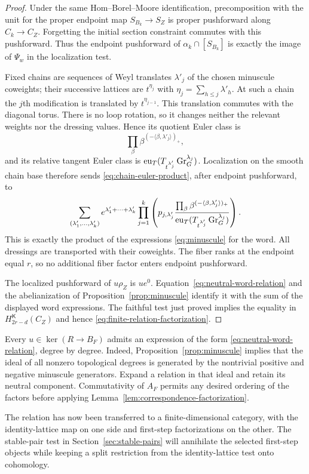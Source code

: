 \begin{proof}
Under the same Hom--Borel--Moore identification, precomposition with the
unit for the proper endpoint map $S_{B_k}\to S_Z$ is proper pushforward
along $C_k\to C_Z$.  Forgetting the initial section constraint commutes
with this pushforward.  Thus the endpoint pushforward of
$\alpha_k\cap[S_{B_k}]$ is exactly the image of $\Psi_w$ in the
localization test.

Fixed chains are sequences of Weyl translates $\lambda'_j$ of the chosen
minuscule coweights; their successive lattices are
$t^{\eta_j}$ with $\eta_j=\sum_{h\leq j}\lambda'_h$.
At such a chain the $j$th modification is translated by
$t^{\eta_{j-1}}$.  This translation commutes with the diagonal torus.
There is no loop rotation, so it changes neither the relevant weights nor
the dressing values.  Hence its quotient Euler class is
\[
 \prod_\beta\beta^{(-\langle\beta,\lambda'_j\rangle)_+},
\]
and its relative tangent Euler class is
$\operatorname{eu}_T(T_{t^{\lambda'_j}}\operatorname{Gr}_G^{\lambda_j})$.
Localization on the smooth chain base therefore sends
\eqref{eq:chain-euler-product}, after endpoint pushforward, to
\[
 \sum_{(\lambda'_1,\ldots,\lambda'_k)}
 e^{\lambda'_1+\cdots+\lambda'_k}
 \prod_{j=1}^k
 \left(
 p_{j,\lambda'_j}
 \frac{\prod_\beta\beta^{(-\langle\beta,\lambda'_j\rangle)_+}}
 {\operatorname{eu}_T(T_{t^{\lambda'_j}}\operatorname{Gr}_G^{\lambda_j})}
 \right).
\]
This is exactly the product of the expressions
\eqref{eq:minuscule} for the word.  All dressings are transported with
their coweights.  The fiber ranks at the endpoint equal $r$, so no
additional fiber factor enters endpoint pushforward.

The localized pushforward of $u\rho_Z$ is $u e^0$.
Equation~\eqref{eq:neutral-word-relation} and the abelianization of
Proposition~\ref{prop:minuscule} identify it with the sum of the displayed
word expressions.  The faithful test just proved implies the equality
in $H^{\mathsf K}_{2r-d}(C_Z)$ and hence
\eqref{eq:finite-relation-factorization}.
\end{proof}

\begin{remark}
Every $u\in\ker(R\to B_F)$ admits an expression of the form
\eqref{eq:neutral-word-relation}, degree by degree.  Indeed,
Proposition~\ref{prop:minuscule} implies that the ideal of all nonzero
topological degrees is generated by the nontrivial positive and negative
minuscule generators.  Expand a relation in that ideal and retain its
neutral component.  Commutativity of $A_F$ permits any desired ordering
of the factors before applying Lemma~\ref{lem:correspondence-factorization}.
\end{remark}

The relation has now been transferred to a finite-dimensional category,
with the identity-lattice map on one side and first-step factorizations
on the other.  The stable-pair test in Section~\ref{sec:stable-pairs}
will annihilate the selected first-step objects while keeping a split
restriction from the identity-lattice test onto cohomology.
